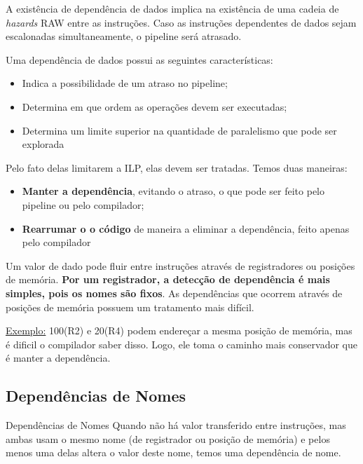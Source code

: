 A existência de dependência de dados implica na existência de uma cadeia de \textit{hazards} RAW entre as instruções. Caso as instruções dependentes de dados sejam escalonadas simultaneamente, o pipeline será atrasado.

Uma dependência de dados possui as seguintes características:
\begin{itemize}
  \item Indica a possibilidade de um atraso no pipeline;
  \item Determina em que ordem as operações devem ser executadas;
  \item Determina um limite superior na quantidade de paralelismo que pode ser explorada
\end{itemize}

Pelo fato delas limitarem a ILP, elas devem ser tratadas. Temos duas maneiras:
\begin{itemize}
  \item \textbf{Manter a dependência}, evitando o atraso, o que pode ser feito pelo pipeline ou pelo compilador;

  \item \textbf{Rearrumar o o código} de maneira a eliminar a dependência, feito apenas pelo compilador
\end{itemize}

Um valor de dado pode fluir entre instruções através de registradores ou posições de memória. \textbf{Por um registrador, a detecção de dependência é mais simples, pois os nomes são fixos}. As dependências que ocorrem através de posições de memória possuem um tratamento mais difícil.

\underline{Exemplo:} 100(R2) e 20(R4) podem endereçar a mesma posição de memória, mas é dificil o compilador saber disso. Logo, ele toma o caminho mais conservador que é manter a dependência.





\subsection{Dependências de Nomes}
\begin{definicao}{Dependências de Nomes}
  Quando não há valor transferido entre instruções, mas ambas usam o mesmo nome (de registrador ou posição de memória) e pelos menos uma delas altera o valor deste nome, temos uma dependência de nome.
\end{definicao}

